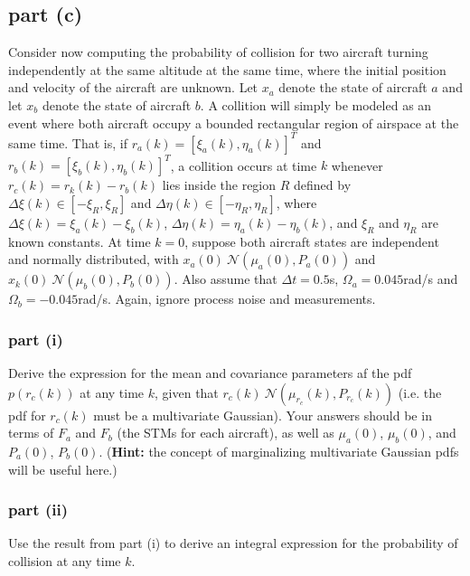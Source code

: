 \documentclass[11pt]{article}
\begin{document}
\subsection*{part (c)}
Consider now computing the probability of collision for two aircraft turning independently at the same altitude at the same time, where the initial position and velocity of the aircraft are unknown. Let $x_a$ denote the state of aircraft $a$ and let $x_b$ denote the state of aircraft $b$. A collition will simply be modeled as an event where both aircraft occupy a bounded rectangular region of airspace at the same time. That is, if $r_a(k)=[\xi_a(k),\eta_a(k)]^T$ and $r_b(k)=[\xi_b(k),\eta_b(k)]^T$, a collition occurs at time $k$ whenever $r_c(k) = r_k(k)-r_b(k)$ lies inside the region $R$ defined by $\Delta\xi(k)\in[-\xi_R,\xi_R]$ and $\Delta\eta(k)\in[-\eta_R,\eta_R]$, where $\Delta\xi(k)=\xi_a(k)-\xi_b(k)$, $\Delta\eta(k)=\eta_a(k)-\eta_b(k)$, and $\xi_R$ and $\eta_R$ are known constants. At time $k=0$, suppose both aircraft states are independent and normally distributed, with $x_a(0)~\mathcal{N}(\mu_a(0),P_a(0))$ and $x_k(0)~\mathcal{N}(\mu_b(0),P_b(0))$. Also assume that $\Delta t=0.5$s, $\Omega_a=0.045$rad/s and $\Omega_b=-0.045$rad/s. Again, ignore process noise and measurements.

\subsubsection*{part (i)}
Derive the expression for the mean and covariance parameters af the pdf $p(r_c(k))$ at any time $k$, given that $r_c(k)~\mathcal{N}(\mu_{r_c}(k),P_{r_c}(k))$ (i.e. the pdf for $r_c(k)$ must be a multivariate Gaussian). Your answers should be in terms of $F_a$ and $F_b$ (the STMs for each aircraft), as well as $\mu_a(0)$, $\mu_b(0)$, and $P_a(0)$, $P_b(0)$. (\textbf{Hint:} the concept of marginalizing multivariate Gaussian pdfs will be useful here.)

\subsubsection*{part (ii)}
Use the result from part (i) to derive an integral expression for the probability of collision at any time $k$.
\end{document}
